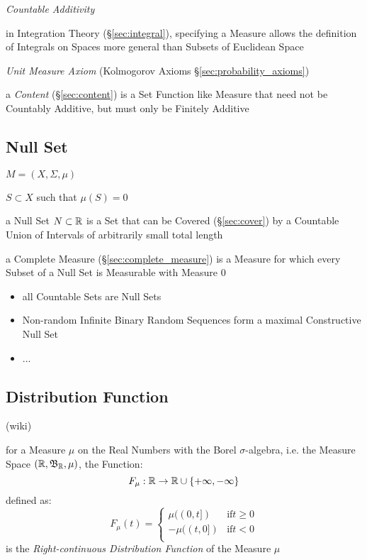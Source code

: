 \emph{Countable Additivity}

in Integration Theory (\S\ref{sec:integral}), specifying a Measure allows the
definition of Integrals on Spaces more general than Subsets of Euclidean Space

\fist \emph{Unit Measure Axiom} (Kolmogorov Axioms
\S\ref{sec:probability_axioms})

\fist a \emph{Content} (\S\ref{sec:content}) is a Set Function like Measure that
need not be Countably Additive, but must only be Finitely Additive



\subsection{Null Set}\label{sec:null_set}

$M = (X, \Sigma, \mu)$

$S \subset X$ such that $\mu(S) = 0$

a Null Set $N \subset \mathbb{R}$ is a Set that can be Covered (\S\ref{sec:cover})
by a Countable Union of Intervals of arbitrarily small total length

a Complete Measure (\S\ref{sec:complete_measure}) is a Measure for which every
Subset of a Null Set is Measurable with Measure $0$

\begin{itemize}
  \item all Countable Sets are Null Sets
  \item Non-random Infinite Binary Random Sequences form a maximal Constructive
    Null Set
  \item ...
\end{itemize}



\subsection{Distribution Function}\label{sec:distribution_function}

(wiki)

for a Measure $\mu$ on the Real Numbers with the Borel $\sigma$-algebra, i.e.
the Measure Space $(\mathbb{R}, \mathfrak{B}_{\mathbb{R}}, \mu)$, the Function:
\[
  F_\mu : \mathbb{R} \rightarrow \mathbb{R} \cup \{+\infty, -\infty\}
\]
defined as:
\[
  F_\mu(t) = \begin{cases}
     \mu((0,t]) & \text{if} t \geq 0 \\
    -\mu((t,0]) & \text{if} t < 0 \\
  \end{cases}
\]
is the \emph{Right-continuous Distribution Function} of the Measure $\mu$

